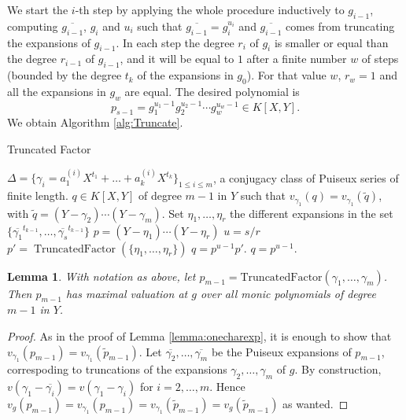 \documentclass[a4paper,11pt]{amsart}%
\theoremstyle{definition}
\theoremstyle{plain}
\newtheorem{lemma}[defn]{Lemma}
\theoremstyle{remark}
\DeclareMathOperator{\TruncatedFactor}{TruncatedFactor}
\begin{document}
We start the $i$-th step by applying the whole procedure inductively to
$g_{i-1}$, computing $\overline{g_{i-1}}$, $g_{i}$ and $u_{i}$ such that
$\overline{g_{i-1}}=g_{i}^{u_{i}}$ and $\overline{g_{i-1}}$ comes from
truncating the expansions of $g_{i-1}$. In each step the degree $r_{i}$ of
$g_{i}$ is smaller or equal than the degree $r_{i-1}$ of $g_{i-1}$, and it
will be equal to $1$ after a finite number $w$ of steps (bounded by the degree
$t_{k}$ of the expansions in $g_{0}$). For that value $w$, $r_{w}=1$ and all
the expansions in $g_{w}$ are equal. The desired polynomial is
\[
p_{s-1}=g_{1}^{u_{1}-1}g_{2}^{u_{2}-1}\cdots g_{w}^{u_{w}-1}\in K[X,Y].
\]
We obtain Algorithm \ref{alg:Truncate}.

\begin{algorithm}                      %
\caption{Truncated Factor}          %
\label{alg:Truncate}
\begin{algorithmic}[1]
\REQUIRE $\Delta = \{\gamma_i = a_1^{(i)} X^{t_1} + \dots + a_k^{(i)} X^{t_k}\}_{1 \leq i \leq m}$, a conjugacy class of Puiseux series of finite length.
\ENSURE $q \in K[X, Y]$ of degree $m-1$ in $Y$ such that $v_{\gamma_1}(q) = v_{\gamma_1}(\tilde q)$, with $\tilde q = (Y - \gamma_2)\cdots (Y-\gamma_m)$.
\STATE Set $\eta_1, \dots, \eta_r$ the different expansions in the set $\{\overline{\gamma_1}^{t_{k-1}}, \dots,  \overline{\gamma_s}^{t_{k-1}}\}$
\STATE $p = (Y- \eta_1)\cdots(Y-\eta_r)$
\STATE $u = s / r$
\STATE $p' = \TruncatedFactor(\{\eta_1, \dots, \eta_r\})$
\RETURN $q = p^{u-1}p'$.
\ELSE
\RETURN $q = p^{u-1}$.
\ENDIF
\end{algorithmic}
\end{algorithm}


\begin{lemma}
\label{lemma:truncatedFactor} With notation as above, let $p_{m-1} =
\text{TruncatedFactor}(\gamma_{1}, \dots, \gamma_{m})$. Then $p_{m-1}$ has maximal valuation at $g$ 
over all monic polynomials of degree $m-1$ in $Y$.
\end{lemma}

\begin{proof}
As in the proof of Lemma \ref{lemma:onecharexp}, it is enough to show that
$v_{\gamma_{1}}(p_{m-1}) = v_{\gamma_{1}}(\tilde p_{m-1})$. Let $\overline{\gamma_{2}}, \dots, \overline
{\gamma_{m}}$ be the Puiseux expansions of $p_{m-1}$, correspoding to truncations of
the expansions $\gamma_{2}, \dots, \gamma_{m}$ of $g$. By construction,
$v(\gamma_{1} - \overline{\gamma_{i}}) = v(\gamma_{1} - \gamma_{i})$ for $i =
2, \dots, m$. Hence $v_g(p_{m-1}) = v_{\gamma_1}(p_{m-1}) = v_{\gamma_{1}}(\tilde p_{m-1}) = v_g(\tilde p_{m-1})$ as wanted.
\end{proof}
\end{document}
